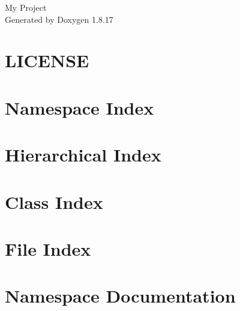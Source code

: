 \let\mypdfximage\pdfximage\def\pdfximage{\immediate\mypdfximage}\documentclass[twoside]{book}
\newcommand{\+}{\discretionary{\mbox{\scriptsize$\hookleftarrow$}}{}{}}
\newcommand{\clearemptydoublepage}{%
  \newpage{\pagestyle{empty}\cleardoublepage}%
}
\begin{document}
\hypersetup{pageanchor=false,
             bookmarksnumbered=true,
             pdfencoding=unicode
            }
\begin{titlepage}
\vspace*{7cm}
\begin{center}%
{\Large My Project }\\
\vspace*{1cm}
{\large Generated by Doxygen 1.8.17}\\
\end{center}
\end{titlepage}
\clearemptydoublepage
{}
\tableofcontents
\clearemptydoublepage
{}
\hypersetup{pageanchor=true}

\chapter{L\+I\+C\+E\+N\+SE}
\label{md_src_main_cpp_extern_RandomCL_LICENSE}

\chapter{Namespace Index}

\chapter{Hierarchical Index}

\chapter{Class Index}

\chapter{File Index}

\chapter{Namespace Documentation}



\end{document}
